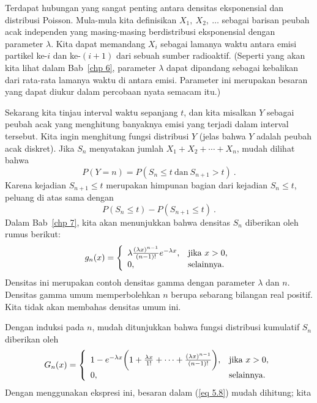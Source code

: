 Terdapat hubungan yang sangat penting antara densitas eksponensial dan distribusi
Poisson.  Mula-mula kita definisikan $X_1,\ X_2,\ \ldots$ sebagai barisan peubah acak
independen yang masing-masing berdistribusi eksponensial dengan parameter $\lambda$.
Kita dapat memandang $X_i$ sebagai lamanya waktu antara emisi partikel ke-$i$ dan
ke-$(i+1)$ dari sebuah sumber radioaktif.  (Seperti yang akan kita lihat dalam
Bab~\ref{chp
6}, parameter $\lambda$ dapat dipandang sebagai kebalikan dari rata-rata
lamanya waktu di antara emisi.  Parameter ini merupakan besaran yang dapat diukur
dalam percobaan nyata semacam itu.)  
\par Sekarang kita tinjau interval waktu sepanjang $t$, dan kita misalkan $Y$ sebagai
peubah acak yang menghitung banyaknya emisi yang terjadi dalam interval tersebut.
Kita ingin menghitung fungsi distribusi $Y$ (jelas bahwa $Y$ adalah peubah acak
diskret).  Jika $S_n$ menyatakan jumlah
$X_1 + X_2 + 
\cdots + X_n$, mudah dilihat bahwa
$$P(Y = n) = P(S_n \le t\ \mbox{dan}\ S_{n+1} > t)\ .$$ 
Karena kejadian $S_{n+1} \le t$ merupakan himpunan bagian dari kejadian $S_n \le t$,
peluang di atas sama dengan
\begin{equation} P(S_n \le t) - P(S_{n+1} \le t)\ .\label{eq 5.8}
\end{equation} Dalam Bab~\ref{chp 7}, kita akan menunjukkan bahwa densitas $S_n$
diberikan oleh rumus berikut:
$$ g_n(x) = \left \{ \begin{array}{ll}
                       \lambda{{(\lambda x)^{n-1}}\over{(n-1)!}}e^{-\lambda x}, 
                                          & \mbox{jika $x > 0$,} \\
                               0,         & \mbox{selainnya.}
                  \end{array}
         \right. 
$$ Densitas ini merupakan contoh densitas gamma
dengan parameter
$\lambda$ dan
$n$.  Densitas gamma umum memperbolehkan $n$ berupa sebarang bilangan real positif.
Kita tidak akan membahas densitas umum ini.
\par
Dengan induksi pada $n$, mudah ditunjukkan bahwa fungsi distribusi kumulatif $S_n$
diberikan oleh
$$ G_n(x) = \left \{ \begin{array}{ll}
                         1 - e^{-\lambda x}\biggl(1 + {{\lambda x}\over {1!}} + \cdots
+
                         {{(\lambda x)^{n-1}}\over{(n-1)!}}\biggr), & \mbox{jika $x >
0$}, \\
                         0,         & \mbox{selainnya.}
                   \end{array}
          \right. 
$$ Dengan menggunakan ekspresi ini, besaran dalam (\ref{eq 5.8}) mudah dihitung; kita
